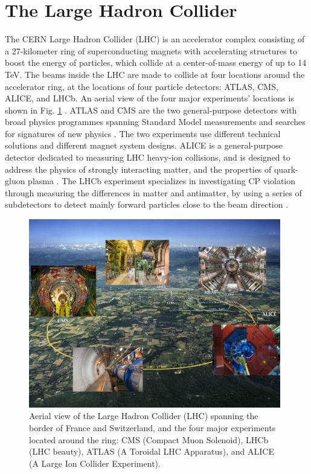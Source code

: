 \section{The Large Hadron Collider}

The CERN Large Hadron Collider (LHC) is an accelerator complex consisting of a 27-kilometer ring of superconducting magnets with accelerating structures to boost the energy of particles, which collide at a center-of-mass energy of up to 14 TeV. The beams inside the LHC are made to collide at four locations around the accelerator ring, at the locations of four particle detectors: ATLAS, CMS, ALICE, and LHCb. An aerial view of the four major experiments' locations is shown in Fig. \ref{fig:aerial-view-LHC-ring} \cite{OPEN-PHO-ACCEL-2017-005}. ATLAS and CMS are the two general-purpose detectors with broad physics programmes spanning Standard Model measurements and searches for signatures of new physics \cite{ATLAS-TDR-14} \cite{CERN-LHCC-2006-001}. The two experiments use different technical solutions and different magnet system designs. ALICE is a general-purpose detector dedicated to measuring LHC heavy-ion collisions, and is designed to address the physics of strongly interacting matter, and the properties of quark-gluon plasma \cite{ALICE-original-TDR}. The LHCb experiment specializes in investigating CP violation through measuring the differences in matter and antimatter, by using a series of subdetectors to detect mainly forward particles close to the beam direction \cite{LHCb-1998}. 

\begin{figure}[ht]
    \centering
    \includegraphics[width=11cm]{figures/ch-2-cern-cms/aerial-view-LHC-ring.jpeg}
    \caption[Aerial view of the Large Hadron Collider (LHC).]{Aerial view of the Large Hadron Collider (LHC) spanning the border of France and Switzerland, and the four major experiments located around the ring: CMS (Compact Muon Solenoid), LHCb (LHC beauty), ATLAS (A Toroidal LHC Apparatus), and ALICE (A Large Ion Collider Experiment). \cite{OPEN-PHO-ACCEL-2017-005}}
    \label{fig:aerial-view-LHC-ring}
\end{figure}


